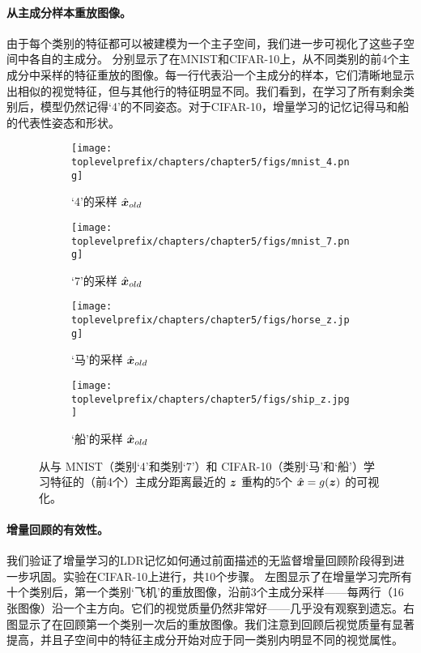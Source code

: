 \documentclass[../../book-main.tex]{subfiles}
\begin{document}
\paragraph{从主成分样本重放图像。}
由于每个类别的特征都可以被建模为一个主子空间，我们进一步可视化了这些子空间中各自的主成分。  分别显示了在MNIST和CIFAR-10上，从不同类别的前4个主成分中采样的特征重放的图像。每一行代表沿一个主成分的样本，它们清晰地显示出相似的视觉特征，但与其他行的特征明显不同。我们看到，在学习了所有剩余类别后，模型仍然记得‘4’的不同姿态。对于CIFAR-10，增量学习的记忆记得马和船的代表性姿态和形状。

\begin{figure}[t]
    \begin{subfigure}[t]{0.20\textwidth}
        \centering
        \texttt{[image: \\toplevelprefix/chapters/chapter5/figs/mnist\_4.png]}
        \caption{‘4’的采样 $\hat{\bm{x}}_{old}$}
    \end{subfigure}
    \hfill
    \begin{subfigure}[t]{0.20\textwidth}
        \centering
        \texttt{[image: \\toplevelprefix/chapters/chapter5/figs/mnist\_7.png]}
        \caption{‘7’的采样 $\hat{\bm{x}}_{old}$}
    \end{subfigure}
    \hfill
    \begin{subfigure}[t]{0.20\textwidth}
        \centering
        \texttt{[image: \\toplevelprefix/chapters/chapter5/figs/horse\_z.jpg]}
        \caption{‘马’的采样 $\hat{\bm{x}}_{old}$}
    \end{subfigure}
    \hfill
    \begin{subfigure}[t]{0.20\textwidth}
        \centering
        \texttt{[image: \\toplevelprefix/chapters/chapter5/figs/ship\_z.jpg]}
        \caption{‘船’的采样 $\hat{\bm{x}}_{old}$}
    \end{subfigure}
    \caption{\small 从与 {MNIST}（类别‘4’和类别‘7’）和 {CIFAR-10}（类别‘马’和‘船’）学习特征的（前4个）主成分距离最近的 $\bm{z}$ 重构的5个 $\hat {\bm{x}}=g(\bm{z})$ 的可视化。}
    \label{fig:pca_sampling_main}
\end{figure}

\paragraph{增量回顾的有效性。}
我们验证了增量学习的LDR记忆如何通过前面描述的无监督增量回顾阶段得到进一步巩固。实验在CIFAR-10上进行，共10个步骤。  左图显示了在增量学习完所有十个类别后，第一个类别‘飞机’的重放图像，沿前3个主成分采样——每两行（16张图像）沿一个主方向。它们的视觉质量仍然非常好——几乎没有观察到遗忘。右图显示了在回顾第一个类别一次后的重放图像。我们注意到回顾后视觉质量有显著提高，并且子空间中的特征主成分开始对应于同一类别内明显不同的视觉属性。
\end{document}
